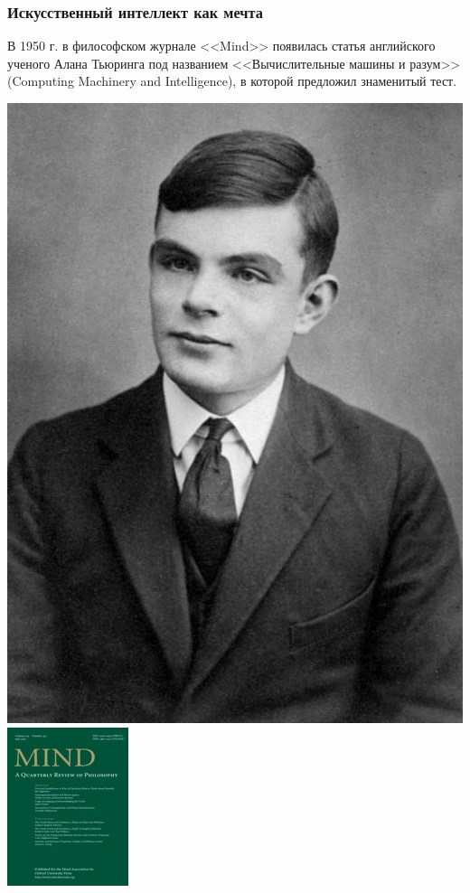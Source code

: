 \documentclass[default]{beamer}
\begin{document}
	\begin{frame}
		\frametitle{Искусственный интеллект как мечта}
		\small
		В 1950 г. в философском журнале <<Mind>> появилась статья английского ученого Алана Тьюринга под названием <<Вычислительные машины и разум>> (Computing Machinery and Intelligence), в которой предложил знаменитый тест.
		\begin{center}
			\includegraphics[height=0.27\textheight]{turing.jpg}\quad
			\includegraphics[height=0.27\textheight]{mind_journal.jpg}

\end{center}
\end{frame}
\end{document}

